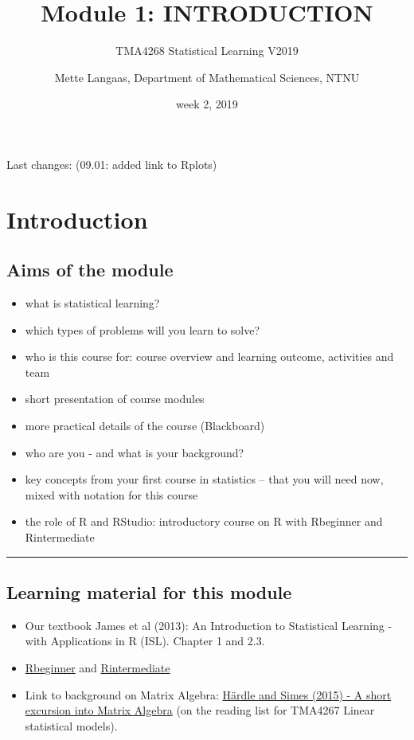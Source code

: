 \documentclass[]{article}
\title{Module 1: INTRODUCTION}
\subtitle{TMA4268 Statistical Learning V2019}
\author{Mette Langaas, Department of Mathematical Sciences, NTNU}
\date{week 2, 2019}
\providecommand{\tightlist}{%
  \setlength{\itemsep}{0pt}\setlength{\parskip}{0pt}}
\begin{document}
\maketitle

{
\setcounter{tocdepth}{2}
\tableofcontents
}
Last changes: (09.01: added link to Rplots)

\hypertarget{introduction}{%
\section{Introduction}\label{introduction}}

\hypertarget{aims-of-the-module}{%
\subsection{Aims of the module}\label{aims-of-the-module}}

\begin{itemize}
\tightlist
\item
  what is statistical learning?
\item
  which types of problems will you learn to solve?
\item
  who is this course for: course overview and learning outcome,
  activities and team
\item
  short presentation of course modules
\item
  more practical details of the course (Blackboard)
\item
  who are you - and what is your background?
\item
  key concepts from your first course in statistics -- that you will
  need now, mixed with notation for this course
\item
  the role of R and RStudio: introductory course on R with Rbeginner and
  Rintermediate
\end{itemize}

\begin{center}\rule{0.5\linewidth}{\linethickness}\end{center}

\hypertarget{learning-material-for-this-module}{%
\subsection{Learning material for this
module}\label{learning-material-for-this-module}}

\begin{itemize}
\tightlist
\item
  Our textbook James et al (2013): An Introduction to Statistical
  Learning - with Applications in R (ISL). Chapter 1 and 2.3.
\item
  \href{https://www.math.ntnu.no/emner/TMA4268/2019v/1Intro/Rbeginner.html}{Rbeginner}
  and
  \href{https://www.math.ntnu.no/emner/TMA4268/2019v/1Intro/Rintermediate.html}{Rintermediate}
\item
  Link to background on Matrix Algebra:
  \href{https://link.springer.com/chapter/10.1007/978-3-662-45171-7_2}{Härdle
  and Simes (2015) - A short excursion into Matrix Algebra} (on the
  reading list for TMA4267 Linear statistical models).
\end{itemize}
\end{document}

